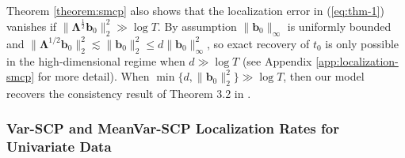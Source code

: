 Theorem \ref{theorem:smcp} also shows that the localization error in (\ref{eq:thm-1}) vanishes if $\lVert\boldsymbol{\Lambda}^{\frac{1}{2}}\mathbf{b}_0\rVert_2^2 \gg \log T$. By assumption $\lVert\mathbf{b}_0\rVert_\infty$ is uniformly bounded and $\lVert\boldsymbol{\Lambda}^{1/2}\mathbf{b}_0\rVert_2^2 \lesssim \lVert\mathbf{b}_0\rVert_2^2 \leq d\lVert\mathbf{b}_0\rVert_\infty^2$, so exact recovery of $t_0$ is only possible in the high-dimensional regime when $d \gg \log T$ (see Appendix \ref{app:localization-smcp} for more detail). When $\min\{d,\lVert\mathbf{b}_0\rVert_2^2\}  \gg \log T$, then our model recovers the consistency result of Theorem 3.2 in \cite{Bai10}. 

%

\subsubsection{Var-SCP and MeanVar-SCP Localization Rates for Univariate Data}

